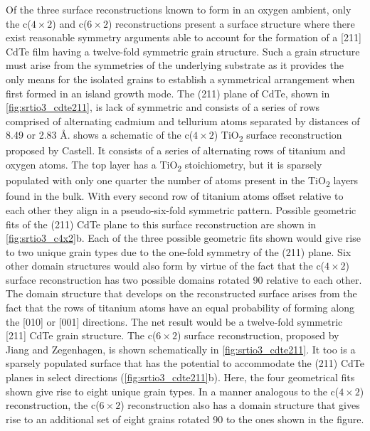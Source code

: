 Of the three surface reconstructions known to form in an oxygen ambient, only the c(\(4\times2\)) and c(\(6\times2\)) reconstructions present a surface structure where there exist reasonable symmetry arguments able to account for the formation of a [211] CdTe film having a twelve-fold symmetric grain structure.
Such a grain structure must arise from the symmetries of the underlying substrate as it provides the only means for the isolated grains to establish a symmetrical arrangement when first formed in an island growth mode.
The (211) plane of CdTe, shown in \cref{fig:srtio3_cdte211}, is lack of symmetric and consists of a series of rows comprised of alternating cadmium and tellurium atoms separated by distances of 8.49 or 2.83 \AA\@.  shows a schematic of the c(\(4\times2\)) TiO\textsubscript{2} surface reconstruction proposed by Castell\cite{Castell2002}.
It consists of a series of alternating rows of titanium and oxygen atoms.
The top layer has a TiO\textsubscript{2} stoichiometry, but it is sparsely populated with only one quarter the number of atoms present in the TiO\textsubscript{2} layers found in the bulk\cite{Castell2002}.
With every second row of titanium atoms offset relative to each other they align in a pseudo-six-fold symmetric pattern.
Possible geometric fits of the (211) CdTe plane to this surface reconstruction are shown in \cref{fig:srtio3_c4x2}b.
Each of the three possible geometric fits shown would give rise to two unique grain types due to the one-fold symmetry of the (211) plane.
Six other domain structures would also form by virtue of the fact that the c(\(4\times2\)) surface reconstruction has two possible domains rotated 90\degree{} relative to each other\cite{Castell2002}.
The domain structure that develops on the reconstructed surface arises from the fact that the rows of titanium atoms have an equal probability of forming along the [010] or [001] directions.
The net result would be a twelve-fold symmetric [211] CdTe grain structure.
The c(\(6\times2\)) surface reconstruction, proposed by Jiang and Zegenhagen\cite{Jiang1996}, is shown schematically in \cref{fig:srtio3_cdte211}.
It too is a sparsely populated surface that has the potential to accommodate the (211) CdTe planes in select directions (\cref{fig:srtio3_cdte211}b).
Here, the four geometrical fits shown give rise to eight unique grain types.
In a manner analogous to the c(\(4\times2\)) reconstruction, the c(\(6\times2\)) reconstruction also has a domain structure that gives rise to an additional set of eight grains rotated 90\degree{} to the ones shown in the figure.
